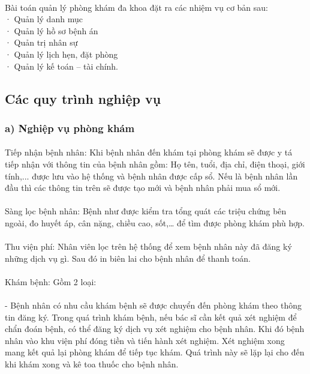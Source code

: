 \documentclass{report}
\begin{document}
\paragraph{}
Bài toán quản lý phòng khám đa khoa đặt ra các nhiệm vụ cơ bản sau:\\
· Quản lý danh mục\\
· Quản lý hồ sơ bệnh án\\
· Quản trị nhân sự\\
· Quản lý lịch hẹn, đặt phòng\\
· Quản lý kế toán – tài chính.
\subsection{Các quy trình nghiệp vụ}

\subsubsection{a) Nghiệp vụ phòng khám}
	\paragraph{}
	Tiếp nhận bệnh nhân: Khi bệnh nhân đến khám tại phòng khám sẽ được y tá tiếp nhận với thông tin của bệnh nhân gồm: Họ tên, tuổi, địa chỉ, điện thoại, giới tính,... được lưu vào hệ thống và bệnh nhân được cấp sổ. Nếu là bệnh nhân lần đầu thì các thông tin trên sẽ được tạo mới và bệnh nhân phải mua sổ mới.
	\paragraph{}
	Sàng lọc bệnh nhân: Bệnh như được kiểm tra tổng quát các triệu chứng bên ngoài, đo huyết áp, cân nặng, chiều cao, sốt,… để tìm được phòng khám phù hợp.
	\paragraph{}
	Thu viện phí: Nhân viên lọc trên hệ thống để xem bệnh nhân này đã đăng ký những dịch vụ gì. Sau đó in biên lai cho bệnh nhân để thanh toán.
	\paragraph{}
	Khám bệnh: Gồm 2 loại:
	\paragraph{}
	-	Bệnh nhân có nhu cầu khám bệnh sẽ được chuyển đến phòng khám theo thông tin đăng ký. Trong quá trình khám bệnh, nếu bác sĩ cần kết quả xét nghiệm để chẩn đoán bệnh, có thể đăng ký dịch vụ xét nghiệm cho bệnh nhân. Khi đó bệnh nhân vào khu viện phí đóng tiền và tiến hành xét nghiệm. Xét nghiệm xong mang kết quả lại phòng khám để tiếp tục khám. Quá trình này sẽ lặp lại cho đến khi khám xong và kê toa thuốc cho bệnh nhân.
\end{document}
